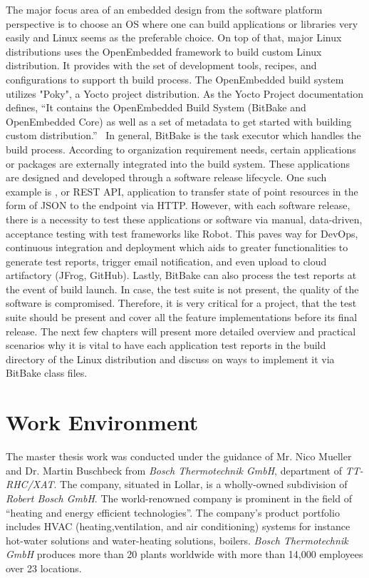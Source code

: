 The major focus area of an embedded design from the software platform perspective is to choose an OS where one can build applications or libraries very easily and Linux seems as the preferable choice. On top of that, major Linux distributions uses the OpenEmbedded framework to build custom Linux distribution.  It provides with the set of development tools, recipes, and configurations to support th build process. The OpenEmbedded build system utilizes "Poky", a Yocto project distribution. As the Yocto Project documentation defines, “It contains the OpenEmbedded Build System (BitBake and OpenEmbedded Core) as well as a set of metadata to get started with building custom distribution.”~\parencite{Reference2} In general, BitBake is the task executor which handles the build process. According to organization requirement needs, certain applications or packages are externally integrated into the build system. These applications are designed and developed through a software release lifecycle. One such example is , or REST API, application to transfer state of point resources in the form of \ac{JSON} to the endpoint via HTTP. However, with each software release, there is a necessity to test these applications or software via manual, data-driven, acceptance testing with test frameworks like Robot. This paves way for DevOps, continuous integration and deployment which aids to greater functionalities to generate test reports, trigger email notification, and even upload to cloud artifactory (JFrog, GitHub).  Lastly, BitBake can also process the test reports at the event of build launch. In case, the test suite is not present, the quality of the software is compromised. Therefore, it is very critical for a project, that the test suite should be present and cover all the feature implementations before its final release. The next few chapters will present more detailed overview and practical scenarios why it is vital to have each application test reports in the build directory of the Linux distribution and discuss on ways to implement it via BitBake class files. 

\section{Work Environment}

The master thesis work was conducted under the guidance of Mr. Nico Mueller and Dr. Martin Buschbeck from \emph{Bosch Thermotechnik GmbH}, department of \emph{TT-RHC/XAT}. The company, situated in Lollar, is a wholly-owned subdivision of \emph{Robert Bosch GmbH}.
The world-renowned company is prominent in the field of \enquote{heating and energy efficient technologies}. The company's product portfolio includes \textsc{HVAC} (heating,ventilation, and air conditioning) systems for instance hot-water solutions and water-heating solutions, boilers. \emph{Bosch Thermotechnik GmbH} produces more than 20 plants worldwide with more than 14,000 employees over 23 locations. 



